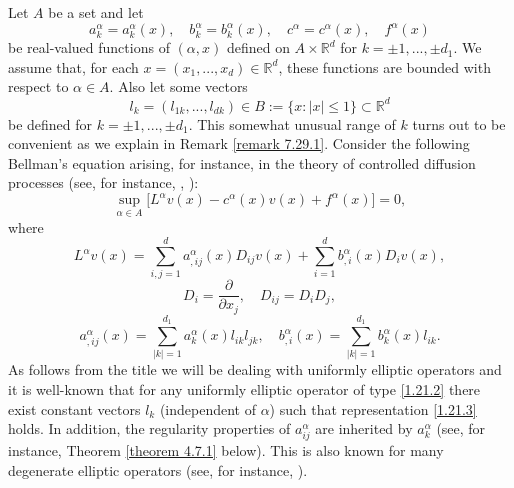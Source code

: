 \documentclass[11pt, reqno]{amsart}
\theoremstyle{definition}
\theoremstyle{remark}
\begin{document}
 Let $A$ be a set and let
$$ 
a_{k}^{\alpha}=a^{\alpha}_{k}( x),\quad
 b_{k}^{\alpha}=b^{\alpha}_{k}( x),\quad
c^{\alpha}=c^{\alpha} ( x),\quad f^{\alpha}(x) 
$$
 be real-valued  
functions of $(\alpha, x)$ 
defined on $A \times{\mathbb{R}}^{d}$ for $k=\pm1,...,\pm d_{1}$.
We assume that, for each $x=(x_{1},...,x_{d})
\in{\mathbb{R}}^{d}$, these functions are bounded
 with respect
to $\alpha\in A$.
Also let some vectors 
$$
l_{k}=(l_{1k },...,l_{dk })\in B:=
\{x:|x|\leq1\}\subset{\mathbb{R}}^{d}
$$ 
be defined
for $k=\pm1,...,\pm d_{1}$. This somewhat unusual
range of $k$ turns out to be convenient as we explain in
Remark \ref{remark 7.29.1}.
Consider the following Bellman's equation arising, for instance, in 
the theory
of controlled diffusion processes (see, for instance, 
\cite{FS06}, \cite{Kr77}):
\begin{equation}
                                              \label{1.21.1}
\sup_{\alpha\in A}\big[ 
 L^{\alpha}v(x) 
-c^{\alpha}( x)v(x)+f^{\alpha}( x) ]=0,
\end{equation}
where
\begin{equation}
                                                    \label{1.21.2}
L^{\alpha}v(x)=\sum_{i,j=1}^{d }a^{\alpha}_{, ij}(x)D_{ij}v(x)
+\sum_{i=1}^{d }b^{\alpha}_{ , i}(x)D_{i}v(x),
\end{equation}
$$
D_{i}=\frac{\partial}{\partial x_{j}},\quad D_{ij}=D_{i}D_{j},
$$
\begin{equation}
                                                    \label{1.21.3}
 a^{\alpha}_{ , ij}(x)=\sum_{|k|=1}^{d_{1}}
a^{\alpha}_{k}(x)l_{ik } l_{jk } ,\quad
b^{\alpha}_{ , i}(x)=
\sum_{|k|=1}^{d_{1}}b^{\alpha}_{k }(x)l_{ik } .
\end{equation}
As follows from the title we will be dealing with
uniformly elliptic operators and
it is well-known that for any uniformly elliptic operator of type
\eqref{1.21.2} there exist constant vectors $l_{k}$
(independent of $\alpha$) such that
representation \eqref{1.21.3} holds. 
In addition, the regularity properties of $a^{\alpha}_{ij}$
are inherited by $a^{\alpha}_{k}$ (see, for instance,
Theorem \ref{theorem 4.7.1} below).
This is also known for many
degenerate elliptic operators (see, for instance,
\cite{Kr08}). 
\end{document}
